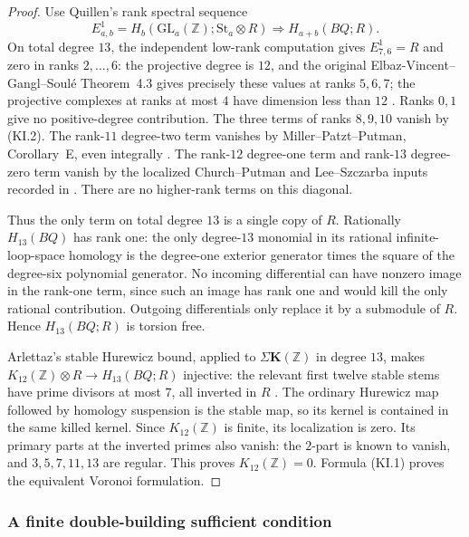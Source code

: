 \documentclass[11pt,a4paper]{article}
\theoremstyle{definition}
\begin{document}
\begin{proof}
Use Quillen's rank spectral sequence
\[
 E^1_{a,b}
 =H_b(\mathrm{GL}_a(\mathbb Z);\mathrm{St}_a\otimes R)
 \Longrightarrow H_{a+b}(BQ;R).
\]
On total degree $13$, the independent low-rank computation gives
$E^1_{7,6}=R$ and zero in ranks $2,\ldots,6$:
the projective degree is $12$, and the original
Elbaz-Vincent--Gangl--Soul\'e Theorem~4.3 gives precisely these values
at ranks $5,6,7$; the projective complexes at ranks at most $4$
have dimension less than $12$
\cite[Theorem~4.3, p.~597; \S3.4]{ElbazGanglSoule2013}.
Ranks $0,1$ give no positive-degree contribution.
The three terms of ranks $8,9,10$ vanish by (KI.2).
The rank-$11$ degree-two term vanishes by
Miller--Patzt--Putman, Corollary~E, even integrally
\cite[Corollary~E, p.~7]{MillerPatztPutman2025}.
The rank-$12$ degree-one term and rank-$13$ degree-zero term
vanish by the localized Church--Putman and Lee--Szczarba inputs
recorded in \cite[Lemmas~2.1--2.2]{Kupers2019}.
There are no higher-rank terms on this diagonal.

Thus the only term on total degree $13$ is a single copy of $R$.
Rationally $H_{13}(BQ)$ has rank one: the only degree-$13$ monomial
in its rational infinite-loop-space homology is the degree-one
exterior generator times the square of the degree-six polynomial
generator.  No incoming differential can have nonzero image in the
rank-one term, since such an image has rank one and would kill the
only rational contribution.  Outgoing differentials only replace it
by a submodule of $R$.  Hence $H_{13}(BQ;R)$ is torsion free.

Arlettaz's stable Hurewicz bound, applied to
$\Sigma\mathbf K(\mathbb Z)$ in degree $13$, makes
$K_{12}(\mathbb Z)\otimes R\to H_{13}(BQ;R)$ injective:
the relevant first twelve stable stems have prime divisors at most
$7$, all inverted in $R$
\cite[Definition~6.5 and Theorem~6.6, pp.~40--42]{Arlettaz2000}.
The ordinary Hurewicz map followed by homology suspension is the
stable map, so its kernel is contained in the same killed kernel.
Since $K_{12}(\mathbb Z)$ is finite, its localization is zero.
Its primary parts at the inverted primes also vanish: the $2$-part
is known to vanish, and $3,5,7,11,13$ are regular.
This proves $K_{12}(\mathbb Z)=0$.  Formula (KI.1) proves the
equivalent Voronoi formulation.
\end{proof}


\subsubsection{A finite double-building sufficient condition}
\end{document}
